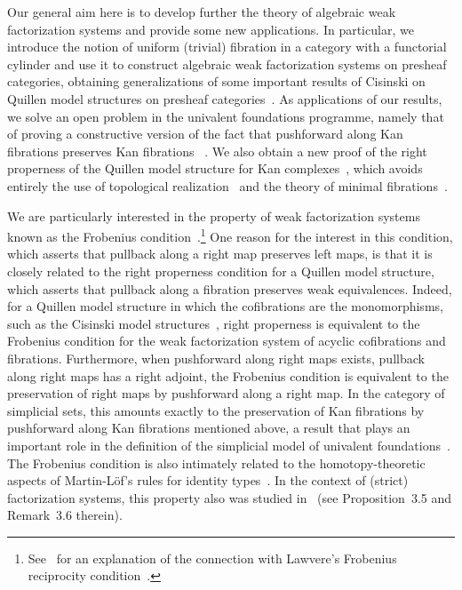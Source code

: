 \documentclass[reqno,10pt,a4paper,oneside,draft]{amsart}
\begin{document}
Our general aim here is to develop further the theory of algebraic weak factorization systems and provide some new applications.
In particular, we introduce the notion of uniform (trivial) fibration in a category with a functorial cylinder and use it to construct algebraic weak factorization systems on presheaf categories, obtaining  generalizations of some important results of Cisinski on Quillen model structures on presheaf categories~\cite{cisinski-asterisque}.
As applications of our results, we solve an open problem in the univalent foundations programme, namely that of proving a constructive version of the fact that pushforward along Kan fibrations preserves Kan fibrations ~\cite{coquand-non-constructivity-kan,voevodsky-simplicial-model}.
We also obtain a new proof of the right properness of the Quillen model structure for Kan complexes~\cite{quillen-homotopical}, which avoids entirely the use of topological realization~\cite{hovey-model-categories} and the theory of minimal fibrations~\cite{joyal-tierney:simplicial-homotopy-theory}.

We are particularly interested in the property of weak factorization systems known as the Frobenius condition~\cite[Definition~3.2.1]{garner:types-omega-groupoids}.\footnote{See~\cite{clementino:frobenius} for an explanation of the connection with Lawvere's Frobenius reciprocity condition~\cite{lawvere-equality}.} One reason for the interest in this condition, which asserts that  pullback along a right map preserves left maps, is that it is closely related to the right properness condition for a Quillen model structure, which asserts that pullback along a fibration preserves weak equivalences.
Indeed, for a Quillen model structure in which the cofibrations are the monomorphisms, such as the Cisinski model structures~\cite{cisinski-asterisque}, right properness is equivalent to the Frobenius condition for the weak factorization system of acyclic cofibrations and fibrations.
Furthermore, when pushforward along right maps exists, \ie pullback along right maps has a right adjoint, the Frobenius condition is equivalent to the preservation of right maps by pushforward along a right map.
In the category of simplicial sets, this amounts exactly to the preservation of Kan fibrations by pushforward along Kan fibrations mentioned above, a result that plays an important role in the definition of the simplicial model of univalent foundations~\cite[Lemma~2.3.1]{voevodsky-simplicial-model}.
The Frobenius condition is also intimately related to the homotopy-theoretic aspects of Martin-L\"of's rules for identity types~\cite{gambino-garner:idtypewfs}.
In the context of (strict) factorization systems, this property also was studied in~\cite{rosicky-tholem-factorization} (see Proposition~3.5 and Remark~3.6 therein).
\end{document}
